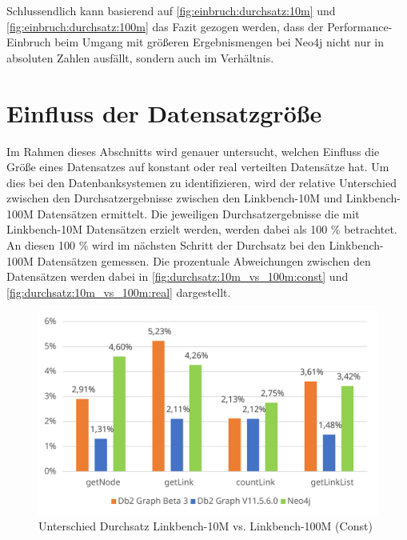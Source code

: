 Schlussendlich kann basierend auf \autoref{fig:einbruch:durchsatz:10m} und \autoref{fig:einbruch:durchsatz:100m} das Fazit gezogen werden, dass der Performance-Einbruch beim Umgang mit größeren Ergebnismengen bei Neo4j nicht nur in absoluten Zahlen ausfällt, sondern auch im Verhältnis.

\section{Einfluss der Datensatzgröße}
\label{auswertung:groesse}
Im Rahmen dieses Abschnitts wird genauer untersucht, welchen Einfluss die Größe eines Datensatzes auf konstant oder real verteilten Datensätze hat. Um dies bei den Datenbanksystemen zu identifizieren, wird der relative Unterschied zwischen den Durchsatzergebnisse zwischen den Linkbench-10M und Linkbench-100M Datensätzen ermittelt. Die jeweiligen Durchsatzergebnisse die mit Linkbench-10M Datensätzen erzielt werden, werden dabei als 100 \% betrachtet. An diesen 100 \% wird im nächsten Schritt der Durchsatz bei den Linkbench-100M Datensätzen gemessen. Die prozentuale Abweichungen zwischen den Datensätzen werden dabei in \autoref{fig:durchsatz:10m_vs_100m:const} und \autoref{fig:durchsatz:10m_vs_100m:real} dargestellt.

\begin{figure}[!ht]
    \centering
    \includegraphics[width=\textwidth]{images/diagramme/difference_durchsatz_const_10m_vs_100m.pdf}
    \caption{Unterschied Durchsatz Linkbench-10M vs. Linkbench-100M (Const)}
    \label{fig:durchsatz:10m_vs_100m:const}
\end{figure}


